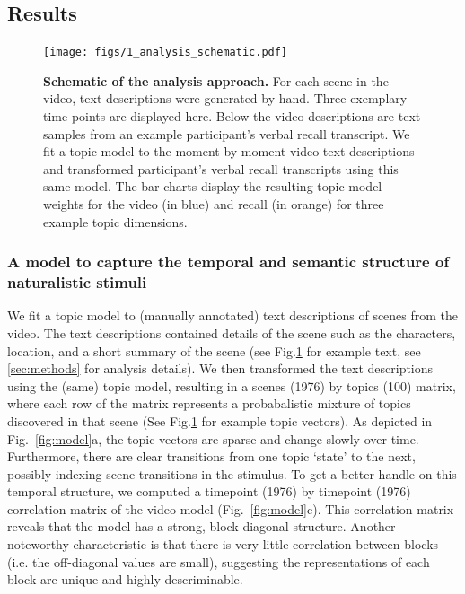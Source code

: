 \documentclass{article}
\begin{document}
{\subsection{Results}

\begin{figure}[t!]
\centering
\texttt{[image: figs/1\_analysis\_schematic.pdf]}
\caption{\small \textbf{Schematic of the analysis approach.} For each scene in the video, text descriptions were generated by hand. Three exemplary time points are displayed here.  Below the video descriptions are text samples from an example participant's verbal recall transcript.  We fit a topic model to the moment-by-moment video text descriptions and transformed participant's verbal recall transcripts using this same model. The bar charts display the resulting topic model weights for the video (in blue) and recall (in orange) for three example topic dimensions.}
\label{fig:schematic}
\end{figure}

\subsubsection{A model to capture the temporal and semantic structure of naturalistic stimuli}
We fit a topic model \citep{BleiEtal03} to (manually annotated) text descriptions of scenes from the video. The text descriptions contained details of the scene such as the characters, location, and a short summary of the scene (see Fig.\ref{fig:schematic} for example text, see \ref{sec:methods} for analysis details). We then transformed the text descriptions using the (same) topic model, resulting in a scenes (1976) by topics (100) matrix, where each row of the matrix represents a probabalistic mixture of topics discovered in that scene (See Fig.\ref{fig:schematic} for example topic vectors). As depicted in Fig.~\ref{fig:model}a, the topic vectors are sparse and change slowly over time. Furthermore, there are clear transitions from one topic `state' to the next, possibly indexing scene transitions in the stimulus. To get a better handle on this temporal structure, we computed a timepoint (1976) by timepoint (1976) correlation matrix of the video model (Fig.~\ref{fig:model}c).  This correlation matrix reveals that the model has a strong, block-diagonal structure. Another noteworthy characteristic is that there is very little correlation between blocks (i.e. the off-diagonal values are small), suggesting the representations of each block are unique and highly descriminable.

}
\end{document}
